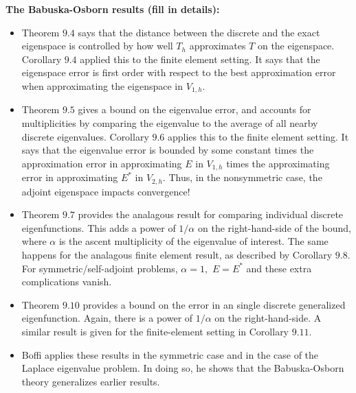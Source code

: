 \documentclass[12pt,a4paper]{article}
\theoremstyle{boldthm}
\theoremstyle{bolddefn}
\begin{document}
\textbf{The Babuska-Osborn results (fill in details):}

\begin{itemize}
    \item Theorem $9.4$ says that the distance between the discrete and the exact eigenspace is controlled by how well $T_h$ approximates $T$ on the eigenspace. Corollary $9.4$ applied this to the finite element setting. It says that the eigenspace error is first order with respect to the best approximation error when approximating the eigenspace in $V_{1, h}.$ 
    \item Theorem $9.5$ gives a bound on the eigenvalue error, and accounts for multiplicities by comparing the eigenvalue to the average of all nearby discrete eigenvalues. Corollary $9.6$ applies this to the finite element setting. It says that the eigenvalue error is bounded by some constant times the approximation error in approximating $E$ in $V_{1, h}$ times the approximating error in approximating $E^*$ in $V_{2, h}.$ Thus, in the nonsymmetric case, the adjoint eigenspace impacts convergence!
    \item Theorem $9.7$ provides the analagous result for comparing individual discrete eigenfunctions. This adds a power of $1/\alpha$ on the right-hand-side of the bound, where $\alpha$ is the ascent multiplicity of the eigenvalue of interest. The same happens for the analagous finite element result, as described by Corollary $9.8.$ For symmetric/self-adjoint problems, $\alpha = 1,$ $E = E^*$ and these extra complications vanish. 
    \item Theorem $9.10$ provides a bound on the error in an single discrete generalized eigenfunction. Again, there is a power of $1/\alpha$ on the right-hand-side. A similar result is given for the finite-element setting in Corollary $9.11.$
    \item Boffi applies these results in the symmetric case and in the case of the Laplace eigenvalue problem. In doing so, he shows that the Babuska-Osborn theory generalizes earlier results. 
\end{itemize}






\newpage


\end{document}
